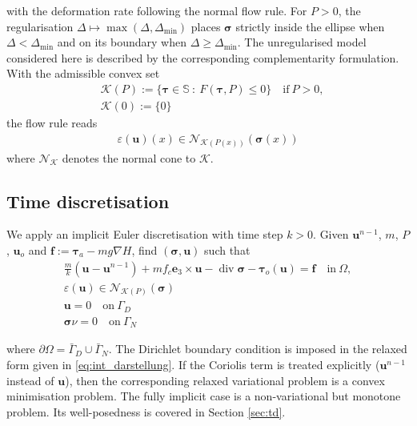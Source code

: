 \documentclass{article}
\theoremstyle{definition}
\newcommand{\bfu}{\boldsymbol{u}}
\newcommand{\bfsigma}{\boldsymbol{\sigma}}
\newcommand{\bftau}{\boldsymbol{\tau}}
\newcommand{\bfe}{\boldsymbol{e}}
\newcommand{\bff}{\boldsymbol{f}}
\newcommand{\K}{\mathcal{K}}
\renewcommand\div{\operatorname{\mathrm{div}}}
\begin{document}
with the deformation rate following the normal flow rule. For $P>0$, the
regularisation $\Delta\mapsto\max(\Delta,\Delta_{\mathrm{min}})$ places
$\bfsigma$ strictly inside the ellipse when $\Delta<\Delta_{\mathrm{min}}$
and on its boundary when $\Delta\geq\Delta_{\mathrm{min}}$. The unregularised
model considered here is described by the corresponding complementarity formulation. With
the admissible convex set
\begin{align*}
    &\K(P) := \{\bftau \in \mathbb S \ : \ F(\bftau, P) \leq 0\} \quad \text{if} \ P>0, \\
    &\K(0) := \{0\}
\end{align*}
the flow rule reads
\begin{align*}
    \varepsilon(\bfu)(x) \in \mathcal{N}_{\K(P(x))}(\bfsigma(x))
\end{align*}
where $\mathcal{N}_{\K}$ denotes the normal cone to $\K$.
\subsection{Time discretisation}
We apply an implicit Euler discretisation with time step $k>0$.
Given $\bfu^{n-1}$, $m$, $P$, $\bfu_o$ and $\bff := \bftau_a -mg\nabla H$, find
$(\bfsigma, \bfu)$ such that
\begin{subequations}
\label{eq:time_discrete_model}
\begin{align}
    \frac{m}{k} (\bfu-\bfu^{n-1}) + m f_c \bfe_3 \times \bfu - \div \bfsigma - \bftau_o(\bfu) = \bff \quad \text{in} \ \Omega, \\
    \varepsilon(\bfu) \in \mathcal{N}_{\K(P)}(\bfsigma)\\
    \bfu = 0 \quad \text{on} \ \Gamma_D \\
    \bfsigma \nu = 0 \quad \text{on} \ \Gamma_N
\end{align}
\end{subequations}

where $\partial\Omega = \bar\Gamma_D \cup \bar\Gamma_N$.
The Dirichlet boundary condition is imposed in the relaxed form given in \eqref{eq:int_darstellung}.
If the Coriolis term is treated explicitly ($\bfu^{n-1}$ instead of $\bfu$),
then the corresponding relaxed variational problem is a convex minimisation
problem. The fully implicit case is a
non-variational but monotone problem. Its well-posedness is covered in Section \ref{sec:td}.
\end{document}
